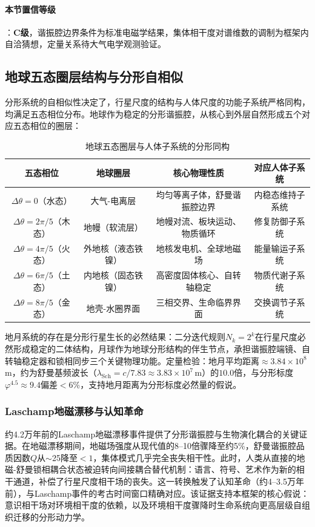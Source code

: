 \documentclass[12pt,a4paper,twocolumn]{article}
\renewcommand{\phi}{\varphi}
\begin{document}
\paragraph{本节置信等级}：\textbf{C级}，谐振腔边界条件为标准电磁学结果，集体相干度对谱维数的调制为框架内自洽猜想，定量关系待大气电学观测验证。


\subsection{地球五态圈层结构与分形自相似}
\label{subsec:earth_moon_fractal}
分形系统的自相似性决定了，行星尺度的结构与人体尺度的功能子系统严格同构，均满足五态相位分布。地球作为稳定的分形谐振腔，从核心到外层自然形成五个对应五态相位的圈层：

\begin{table}[H]
\centering
\footnotesize
\caption{地球五态圈层与人体子系统的分形同构}
\begin{tabular}{c|c|c|c}
\hline
\textbf{五态相位} & \textbf{地球圈层} & \textbf{核心物理性质} & \textbf{对应人体子系统} \\
\hline
$\Delta\theta=0$（水态） & 大气-电离层 & 均匀等离子体，舒曼谐振腔边界 & 内稳态维持子系统 \\
$\Delta\theta=2\pi/5$（木态） & 地幔（软流层） & 地幔对流、板块运动、物质循环 & 修复防御子系统 \\
$\Delta\theta=4\pi/5$（火态） & 外地核（液态铁镍） & 地核发电机、全球地磁场 & 能量输运子系统 \\
$\Delta\theta=6\pi/5$（土态） & 内地核（固态铁镍） & 高密度固体核心、自转轴稳定 & 物质代谢子系统 \\
$\Delta\theta=8\pi/5$（金态） & 地壳-水圈界面 & 三相交界、生命临界界面 & 交换调节子系统 \\
\hline
\end{tabular}
\end{table}

地月系统的存在是分形行星生长的必然结果：二分迭代规则$N_k=2^k$在行星尺度必然形成稳定的二体结构，月球作为地球分形结构的伴生节点，承担谐振腔端镜、自转轴稳定器和锁相同步三个关键物理功能。定量检验：地月平均距离$\approx 3.84\times10^8$\,m，约为舒曼基频波长（$\lambda_{\text{Sch}}=c/7.83\approx3.83\times10^7$\,m）的$10.0$倍，与分形标度$\phi^{4.5}\approx9.4$偏差$<$6\%，支持地月距离为分形标度必然量的假说。

\subsubsection{Laschamp地磁漂移与认知革命}
\label{subsec:laschamp}
约4.2万年前的Laschamp地磁漂移事件提供了分形谐振腔与生物演化耦合的关键证据。在地磁漂移期间，地磁场强度从现代值的8--10倍骤降至约5\%，舒曼谐振腔品质因数$Q$从$\sim$25降至$<1$，集体模式几乎完全丧失相干性。此时，人类从直接的地磁-舒曼锁相耦合状态被迫转向间接耦合替代机制：语言、符号、艺术作为新的相干通道，补偿了行星尺度相干场的丧失。这一转换触发了认知革命（约4--3.5万年前），与Laschamp事件的考古时间窗口精确对应。该证据支持本框架的核心假说：意识相干场对环境相干度的依赖，以及环境相干度骤降时生命系统向更高层级自组织迁移的分形动力学。
\end{document}

